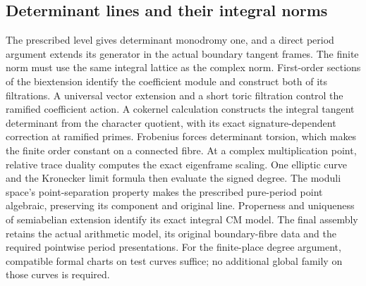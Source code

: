 \subsection{Determinant lines and their integral norms}
\label{shared-integral-determinants}

The prescribed level gives determinant monodromy one, and a direct period
argument extends its generator in the actual boundary tangent frames.
The finite norm must use the same integral lattice as the complex norm.
First-order sections of the biextension
identify the coefficient module and construct both of its filtrations.
A universal vector extension and a short toric filtration control the
ramified coefficient action. A cokernel calculation constructs the
integral tangent determinant from the character quotient, with its exact
signature-dependent correction at ramified primes. Frobenius forces
determinant torsion, which makes the finite order constant on a connected
fibre. At a complex
multiplication point, relative trace duality computes the exact
eigenframe scaling. One elliptic curve and the Kronecker limit formula
then evaluate the signed degree. The moduli space's point-separation
property makes the prescribed pure-period point algebraic, preserving
its component and original line. Properness and uniqueness of
semiabelian extension identify its exact integral CM model.
The final assembly retains the actual arithmetic model, its original
boundary-fibre data and the required pointwise period presentations.
For the finite-place degree argument, compatible formal charts on test
curves suffice; no additional global family on those curves is required.














